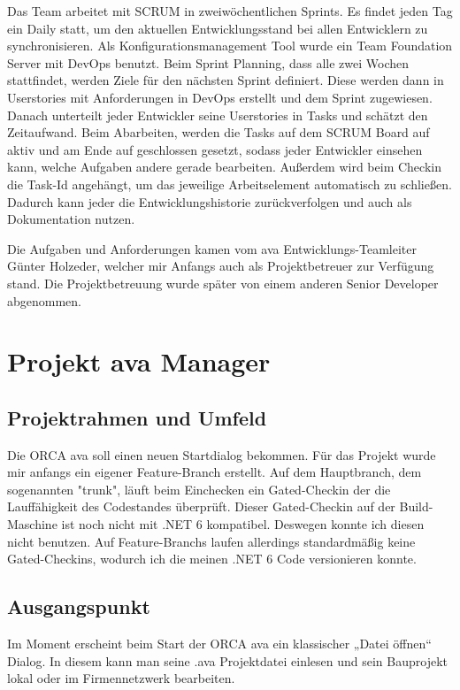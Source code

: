 Das Team arbeitet mit SCRUM in zweiwöchentlichen Sprints. Es findet jeden Tag ein Daily statt, um den aktuellen Entwicklungsstand bei allen Entwicklern zu synchronisieren.
Als Konfigurationsmanagement Tool wurde ein Team Foundation Server mit DevOps benutzt.
Beim Sprint Planning, dass alle zwei Wochen stattfindet, werden Ziele für den nächsten Sprint definiert. Diese werden dann in Userstories mit Anforderungen in DevOps erstellt und dem Sprint zugewiesen. Danach unterteilt jeder Entwickler seine Userstories in Tasks und schätzt den Zeitaufwand. Beim Abarbeiten, werden die Tasks auf dem SCRUM Board auf aktiv und am Ende auf geschlossen gesetzt, sodass jeder Entwickler einsehen kann, welche Aufgaben andere gerade bearbeiten. Außerdem wird beim Checkin die Task-Id angehängt, um das jeweilige Arbeitselement automatisch zu schließen. Dadurch kann jeder die Entwicklungshistorie zurückverfolgen und auch als Dokumentation nutzen.

Die Aufgaben und Anforderungen kamen vom \ac{ava} Entwicklungs-Teamleiter Günter Holzeder, welcher mir Anfangs auch als Projektbetreuer zur Verfügung stand. Die Projektbetreuung wurde später von einem anderen Senior Developer abgenommen.

\chapter{Projekt \ac{ava} Manager}

\section{Projektrahmen und Umfeld}

Die ORCA \ac{ava} soll einen neuen Startdialog bekommen. Für das Projekt wurde mir anfangs ein eigener Feature-Branch erstellt. Auf dem Hauptbranch, dem sogenannten "trunk", läuft beim Einchecken ein Gated-Checkin der die Lauffähigkeit des Codestandes überprüft. Dieser Gated-Checkin auf der Build-Maschine ist noch nicht mit .NET 6 kompatibel. Deswegen konnte ich diesen nicht benutzen. Auf  Feature-Branchs laufen allerdings standardmäßig keine Gated-Checkins, wodurch ich die meinen .NET 6 Code versionieren konnte.

\section{Ausgangspunkt}
Im Moment erscheint beim Start der ORCA \ac{ava} ein klassischer „Datei öffnen“ Dialog. In diesem kann man seine .ava Projektdatei einlesen und sein Bauprojekt lokal oder im Firmennetzwerk bearbeiten. 

